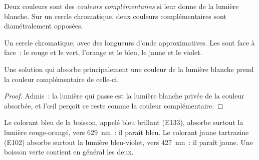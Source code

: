 \begin{definition}\label{def:g11:absorbance:complementary}
Deux couleurs sont des \emph{couleurs complémentaires}
si leur  donne de la lumière blanche. Sur un cercle chromatique,
deux couleurs complémentaires sont diamétralement opposées.
\end{definition}

\begin{omfigure}

{\small Un cercle chromatique, avec des longueurs d'onde approximatives.
Les  sont face à face~: le rouge et le vert,
l'orange et le bleu, le jaune et le violet.}
\end{omfigure}

\begin{proposition}\label{prop:g11:absorbance:colour-seen}
Une solution qui absorbe principalement une couleur de la lumière
blanche prend la couleur complémentaire de celle-ci.
\end{proposition}

\begin{proof}
Admis~: la lumière qui passe est la lumière blanche privée de la couleur
absorbée, et l'œil perçoit ce reste comme la couleur complémentaire.
\end{proof}

\begin{example}\label{ex:g11:absorbance:dyes}
Le colorant bleu de la boisson, appelé bleu brillant (E133), absorbe
surtout la lumière rouge-orangé, vers \qty{629}{nm}~: il paraît bleu. Le
colorant jaune tartrazine (E102) absorbe surtout la lumière bleu-violet,
vers \qty{427}{nm}~: il paraît jaune. Une boisson verte contient en
général les deux.
\end{example}

